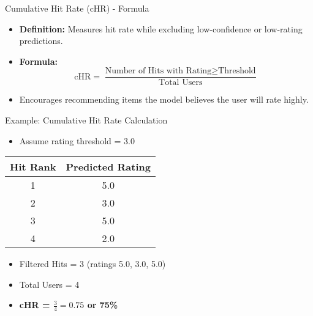 \documentclass{beamer}
\begin{document}
\begin{frame}{Cumulative Hit Rate (cHR) - Formula}
\begin{itemize}
    \item \textbf{Definition:} Measures hit rate while excluding low-confidence or low-rating predictions.
    \item \textbf{Formula:}
    \[
    \text{cHR} = \frac{\text{Number of Hits with Rating} \geq \text{Threshold}}{\text{Total Users}}
    \]
    \item Encourages recommending items the model believes the user will rate highly.
\end{itemize}
\end{frame}

\begin{frame}{Example: Cumulative Hit Rate Calculation}
\begin{itemize}
    \item Assume rating threshold = 3.0
\end{itemize}
\begin{center}
\begin{tabular}{|c|c|}
\hline
\textbf{Hit Rank} & \textbf{Predicted Rating} \\ \hline
1 & 5.0 \\ \hline
2 & 3.0 \\ \hline
3 & 5.0 \\ \hline
4 & 2.0 \\ \hline
\end{tabular}
\end{center}
\vspace{0.5em}
\begin{itemize}
    \item Filtered Hits = 3 (ratings 5.0, 3.0, 5.0)
    \item Total Users = 4
    \item \textbf{cHR = \( \frac{3}{4} = 0.75 \) or 75\%}
\end{itemize}
\end{frame}
\end{document}
